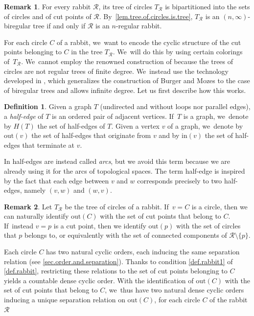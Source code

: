 \documentclass[10pt,a4paper]{amsart}
\theoremstyle{definition}
\newtheorem{definition}[definition]{Definition}
\newtheorem{remark}[remark]{Remark}
\newcommand{\R}{\mathcal{R}}
\begin{document}
\begin{remark}
For every rabbit $\R$, its tree of circles $T_\R$ is bipartitioned into the sets of circles and of cut points of $\R$. By~\cref{lem.tree.of.circles.is.tree}, $T_\R$ is an $(n,\infty)$-biregular tree if and only if $\R$ is an $n$-regular rabbit.
\end{remark}

For each circle $C$ of a rabbit, we~want to encode the cyclic structure of the cut points belonging to $C$ in the tree $T_\R$. We~will do this by using certain colorings of~$T_\R$. We~cannot employ the renowned construction of \cite{BM00} because the trees of circles are not regular trees of finite degree. We~instead use the technology developed in \cite{biregular}, which generalizes the construction of Burger and Mozes to the case of biregular trees and allows infinite degree.
Let us first describe how this works.

\begin{definition}
\label{def.half.edges}
Given a graph $T$ (undirected and without loops nor parallel edges), a \emph{half-edge} of $T$ is an ordered pair of adjacent vertices. If~$T$ is a graph, we~denote by $H(T)$ the set of half-edges of $T$.
Given a vertex $v$ of a graph, we~denote by $\mathrm{out}(v)$ the set of half-edges that originate from $v$ and by $\mathrm{in}(v)$ the set of half-edges that terminate at $v$.
\end{definition}

In \cite{biregular} half-edges are instead called \textit{arcs}, but we avoid this term because we are already using it for the arcs of topological spaces.
The term half-edge is inspired by the fact that each edge between $v$ and $w$ corresponds precisely to two half-edges, namely $(v,w)$ and $(w,v)$.

\begin{remark}
\label{rmk.rabbit.tree.separation.relation}
Let $T_\R$ be the tree of circles of a rabbit. If~$v = C$ is a circle, then we can naturally identify $\mathrm{out}(C)$ with the set of cut points that belong to $C$. If~instead $v = p$ is a cut point, then we identify $\mathrm{out}(p)$ with the set of circles that $p$ belongs to, or equivalently with the set of connected components of $\R \setminus \{p\}$.

Each circle $C$ has two natural cyclic orders, each inducing the same separation relation (see \cref{sec.order.and.separation}).
Thanks to condition \cref{def.rabbit1} of \cref{def.rabbit}, restricting these relations to the set of cut points belonging to $C$ yields a countable dense cyclic order.
With the identification of $\mathrm{out}(C)$ with the set of cut points that belong to $C$, we~thus have two natural dense cyclic orders inducing a unique separation relation on $\mathrm{out}(C)$, for each circle $C$ of the rabbit $\R$
\end{remark}
\end{document}
